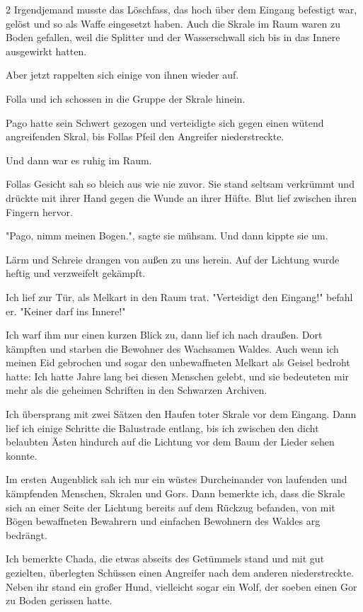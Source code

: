 \documentclass[10pt, a4paper, oneside]{book}
\begin{document}
\begin{multicols}{2}
Irgendjemand musste das Löschfass, das hoch über dem Eingang befestigt war, gelöst und so als Waffe eingesetzt haben. Auch die Skrale im Raum waren zu Boden gefallen, weil die Splitter und der Wasserschwall sich bis in das Innere ausgewirkt hatten.

Aber jetzt rappelten sich einige von ihnen wieder auf.

Folla und ich schossen in die Gruppe der Skrale hinein.

Pago hatte sein Schwert gezogen und verteidigte sich gegen einen wütend angreifenden Skral, bis Follas Pfeil den Angreifer niederstreckte.

Und dann war es ruhig im Raum.

Follas Gesicht sah so bleich aus wie nie zuvor. Sie stand seltsam verkrümmt und drückte mit ihrer Hand gegen die Wunde an ihrer Hüfte. Blut lief zwischen ihren Fingern hervor.

"Pago, nimm meinen Bogen.", sagte sie mühsam. Und dann kippte sie um.

Lärm und Schreie drangen von außen zu uns herein. Auf der Lichtung wurde heftig und verzweifelt gekämpft.

Ich lief zur Tür, als Melkart in den Raum trat. "Verteidigt den Eingang!" befahl er. "Keiner darf ins Innere!"

Ich warf ihm nur einen kurzen Blick zu, dann lief ich nach draußen. Dort kämpften und starben die Bewohner des Wachsamen Waldes. Auch wenn ich meinen Eid gebrochen und sogar den unbewaffneten Melkart als Geisel bedroht hatte: Ich hatte Jahre lang bei diesen Menschen gelebt, und sie bedeuteten mir mehr als die geheimen Schriften in den Schwarzen Archiven.

Ich übersprang mit zwei Sätzen den Haufen toter Skrale vor dem Eingang. Dann lief ich einige Schritte die Balustrade entlang, bis ich zwischen den dicht belaubten Ästen hindurch auf die Lichtung vor dem Baum der Lieder sehen konnte.

Im ersten Augenblick sah ich nur ein wüstes Durcheinander von laufenden und kämpfenden Menschen, Skralen und Gors. Dann bemerkte ich, dass die Skrale sich an einer Seite der Lichtung bereits auf dem Rückzug befanden, von mit Bögen bewaffneten Bewahrern und einfachen Bewohnern des Waldes arg bedrängt.

Ich bemerkte Chada, die etwas abseits des Getümmels stand und mit gut gezielten, überlegten Schüssen einen Angreifer nach dem anderen niederstreckte. Neben ihr stand ein großer Hund, vielleicht sogar ein Wolf, der soeben einen Gor zu Boden gerissen hatte.


\end{multicols}
\end{document}

